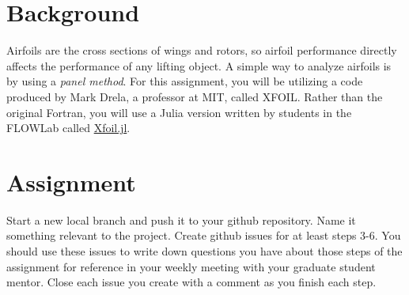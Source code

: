 \documentclass[12pt]{article}
\begin{document}
\section{Background}

Airfoils are the cross sections of wings and rotors, so airfoil performance directly affects the performance of any lifting object.
A simple way to analyze airfoils is by using a \textit{panel method}. 
For this assignment, you will be utilizing a code produced by Mark Drela, a professor at MIT, called XFOIL.  Rather than the original Fortran, you will use a Julia version written by students in the FLOWLab called \href{https://github.com/byuflowlab/Xfoil.jl}{Xfoil.jl}.


\section{Assignment}

Start a new local branch and push it to your github repository. Name it something relevant to the project. Create github issues for at least steps 3-6. You should use these issues to write down questions you have about those steps of the assignment for reference in your weekly meeting with your graduate student mentor. Close each issue you create with a comment as you finish each step. 
\end{document}
